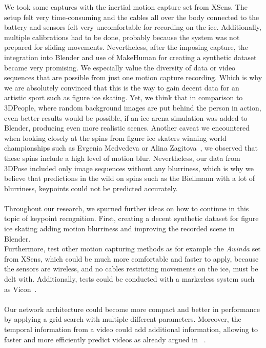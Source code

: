 We took some captures with the inertial motion capture set from XSens.
The setup felt very time-consuming and the cables all over the body connected to the battery and sensors felt very uncomfortable
for recording on the ice.
Additionally, multiple calibrations had to be done, probably because the system was not prepared
for sliding movements.
Nevertheless, after the imposing capture, the integration into Blender and use of MakeHuman for creating a synthetic dataset
became very promising.
We especially value the diversity of data or video sequences that are possible from just one motion capture recording.
Which is why we are absolutely convinced that this is the way to gain decent data for an artistic sport such as figure
ice skating.
Yet, we think that in comparison to 3DPeople, where random background images are put behind the person in action, even
better results would be possible, if an ice arena simulation was added to Blender, producing even more realistic scenes.
Another caveat we encountered when looking closely at the spins from figure ice skaters winning world championships such as
Evgenia Medvedeva or Alina Zagitova~\cite{2018world}, we observed that these spins include a high level of motion blur.
Nevertheless, our data from 3DPose included only image sequences without any blurriness, which is why we believe that
predictions in the wild on spins such as the Biellmann with a lot of blurriness, keypoints could not be predicted accurately.
\\\mbox{}\\
Throughout our research, we spurned further ideas on how to continue in this topic of keypoint recognition.
First, creating a decent synthetic dataset for figure ice skating adding motion blurriness and improving the recorded scene
in Blender.\\
Furthermore, test other motion capturing methods as for example the \textit{Awinda} set from XSens, which could be much more comfortable
and faster to apply, because the sensors are wireless, and no cables restricting movements on the ice, must be delt with.
Additionally, tests could be conducted with a markerless system such as Vicon~\cite{mocapoptical}.
\\\mbox{}\\
Our network architecture could become more compact and better in performance by applying a grid search with multiple different
parameters.
Moreover, the temporal information from a video could add additional information, allowing to faster and more efficiently
predict videos as already argued in ~\cite{staf}.
